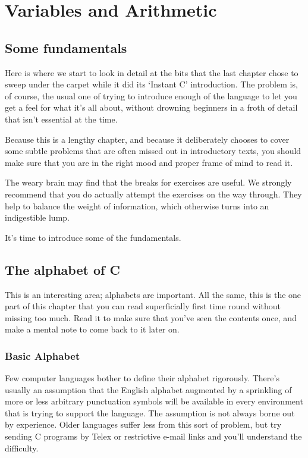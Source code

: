  \chapter{Variables and Arithmetic}


        \section{Some fundamentals}
        

  

  Here is where we start to look in detail at the bits that the last
   chapter chose to sweep under the carpet while it did its
   `Instant C' introduction. The problem is, of course, the usual
   one of trying to introduce enough of the language to let you get a feel for
   what it's all about, without drowning beginners in a froth of detail that
   isn't essential at the time.


  Because this is a lengthy chapter, and because it deliberately chooses to
   cover some subtle problems that are often missed out in introductory texts,
   you should make sure that you are in the right mood and proper frame of
   mind to read it.


  The weary brain may find that the breaks for exercises are useful. We
   strongly recommend that you do actually attempt the exercises on the way
   through. They help to balance the weight of information, which otherwise
   turns into an indigestible lump.


  It's time to introduce some of the fundamentals.


 
        \section{The alphabet of C}
        

  

  This is an interesting area; alphabets are important. All the same, this
   is the one part of this chapter that you can read superficially first time
   round without missing too much. Read it to make sure that you've seen the
   contents once, and make a mental note to come back to it later on.


  \subsection{Basic Alphabet}
   

   Few computer languages bother to define their alphabet rigorously.
    There's usually an assumption that the English alphabet augmented by a
    sprinkling of more or less arbitrary punctuation symbols will be available
    in every environment that is trying to support the language. The
    assumption is not always borne out by experience. Older languages suffer
    less from this sort of problem, but try sending C programs by Telex
    or restrictive e-mail links and you'll understand the difficulty.


